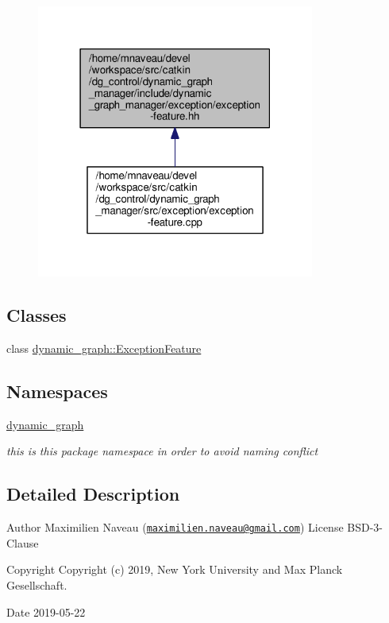 \begin{figure}[H]
\begin{center}
\leavevmode
\includegraphics[width=259pt]{exception-feature_8hh__dep__incl}
\end{center}
\end{figure}
\subsection*{Classes}
\begin{DoxyCompactItemize}
\item 
class \hyperlink{classdynamic__graph_1_1ExceptionFeature}{dynamic\+\_\+graph\+::\+Exception\+Feature}
\end{DoxyCompactItemize}
\subsection*{Namespaces}
\begin{DoxyCompactItemize}
\item 
 \hyperlink{namespacedynamic__graph}{dynamic\+\_\+graph}
\begin{DoxyCompactList}\small\item\em this is this package namespace in order to avoid naming conflict \end{DoxyCompactList}\end{DoxyCompactItemize}


\subsection{Detailed Description}
\begin{DoxyAuthor}{Author}
Maximilien Naveau (\href{mailto:maximilien.naveau@gmail.com}{\tt maximilien.\+naveau@gmail.\+com})  License B\+S\+D-\/3-\/\+Clause 
\end{DoxyAuthor}
\begin{DoxyCopyright}{Copyright}
Copyright (c) 2019, New York University and Max Planck Gesellschaft. 
\end{DoxyCopyright}
\begin{DoxyDate}{Date}
2019-\/05-\/22 
\end{DoxyDate}
